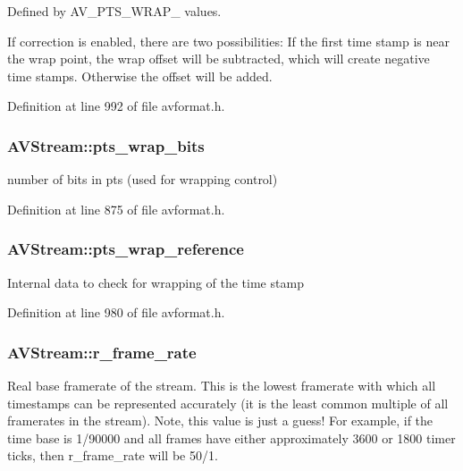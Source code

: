 Defined by A\+V\+\_\+\+P\+T\+S\+\_\+\+W\+R\+A\+P\+\_\+ values.

If correction is enabled, there are two possibilities\+: If the first time stamp is near the wrap point, the wrap offset will be subtracted, which will create negative time stamps. Otherwise the offset will be added. 

Definition at line 992 of file avformat.\+h.

\subsubsection[{\texorpdfstring{pts\+\_\+wrap\+\_\+bits}{pts_wrap_bits}}]{ A\+V\+Stream\+::pts\+\_\+wrap\+\_\+bits}\hypertarget{struct_a_v_stream_a6cdb0c90a69899f4e1e54704bb654936}{}\label{struct_a_v_stream_a6cdb0c90a69899f4e1e54704bb654936}
number of bits in pts (used for wrapping control) 

Definition at line 875 of file avformat.\+h.

\subsubsection[{\texorpdfstring{pts\+\_\+wrap\+\_\+reference}{pts_wrap_reference}}]{ A\+V\+Stream\+::pts\+\_\+wrap\+\_\+reference}\hypertarget{struct_a_v_stream_a5456b9e13c27ed10d42259f46297da5d}{}\label{struct_a_v_stream_a5456b9e13c27ed10d42259f46297da5d}
Internal data to check for wrapping of the time stamp 

Definition at line 980 of file avformat.\+h.

\subsubsection[{\texorpdfstring{r\+\_\+frame\+\_\+rate}{r_frame_rate}}]{ A\+V\+Stream\+::r\+\_\+frame\+\_\+rate}\hypertarget{struct_a_v_stream_ad63fb11cc1415e278e09ddc676e8a1ad}{}\label{struct_a_v_stream_ad63fb11cc1415e278e09ddc676e8a1ad}
Real base framerate of the stream. This is the lowest framerate with which all timestamps can be represented accurately (it is the least common multiple of all framerates in the stream). Note, this value is just a guess! For example, if the time base is 1/90000 and all frames have either approximately 3600 or 1800 timer ticks, then r\+\_\+frame\+\_\+rate will be 50/1.

